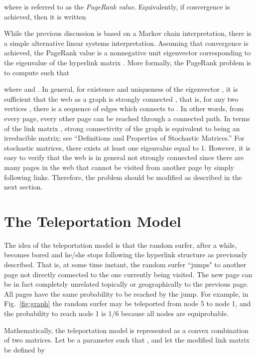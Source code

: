 \documentclass[11pt,draftcls,onecolumn]{IEEEtran}
\begin{document}
where  is referred to as the {\it PageRank value}. 
Equivalently, if convergence is achieved, then it is written 


While the previous discussion is based on a Markov chain interpretation, there is a 
simple alternative linear systems interpretation. Assuming that convergence is achieved, 
the PageRank value  is a nonnegative unit eigenvector corresponding to the eigenvalue  
of the hyperlink matrix . More formally, the PageRank problem is to compute  
such that

where  and . In general, for existence and uniqueness 
of the eigenvector ,  it is sufficient that the web as a graph is strongly connected
\cite{HorJoh:85}, that is, for any two vertices , there is a sequence of
edges which connects  to . In other words, from every page, 
every other page can be reached through a connected path. 
In terms of the link matrix , strong connectivity 
of the graph is equivalent to  being an irreducible matrix; 
see ``Definitions and Properties of Stochastic Matrices.''
For stochastic matrices, there exists at least one eigenvalue equal to 1. 
However, it is easy to verify that the web is in general not strongly connected
since there are many pages in the web that cannot be visited from another page
by simply following links. Therefore, the problem should be 
modified as described in the next section.


\section*{The Teleportation Model}

The idea of the teleportation model is that the random surfer, after a while, becomes bored and 
he/she stops following the hyperlink structure as previously described. That is, at some time instant, 
the random surfer ``jumps" to another page not directly connected to the one currently being visited. 
The new page can be in fact completely unrelated 
topically or geographically to
the previous page. All  pages have the same probability  to be reached 
by the jump. For example, in Fig.~\ref{fig:graph} the random surfer may be teleported from 
node 5 to node 1, and the probability to reach node 1 is 1/6 because all nodes are equiprobable.

Mathematically, the teleportation model is represented as a convex combination of two matrices. 
Let  be a parameter such that , and let the modified link matrix  
be defined by
\end{document}
